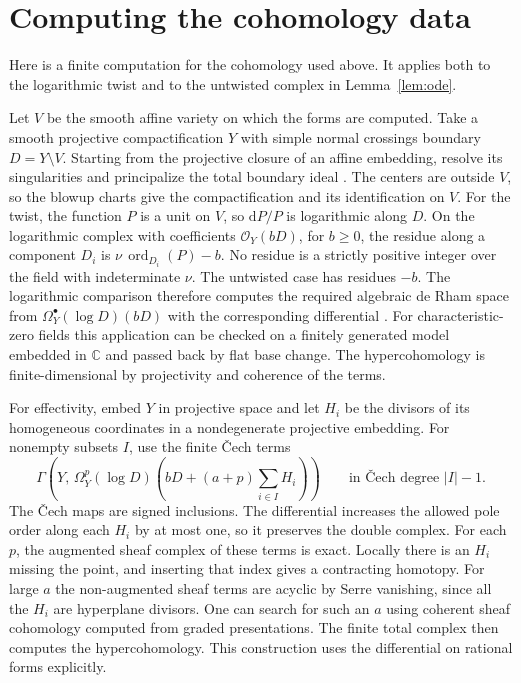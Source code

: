 \documentclass[11pt]{article}
\newcommand{\A}{\mathcal O}
\newcommand{\dd}{\mathrm d}
\begin{document}
\section{Computing the cohomology data}\label{sec:effective}

Here is a finite computation for the cohomology used above.
It applies both to the logarithmic twist and to the untwisted
complex in Lemma~\ref{lem:ode}.

Let \(V\) be the smooth affine variety on which the forms are
computed. Take a smooth projective compactification \(Y\) with
simple normal crossings boundary \(D=Y\setminus V\).
Starting from the projective closure of an affine embedding,
resolve its singularities and principalize the total boundary
ideal \cite[Theorems 1.6 and 1.10]{BM}. The centers are outside
\(V\), so the blowup charts give the compactification and its
identification on \(V\). For the twist, the
function \(P\) is a unit on \(V\), so \(\dd P/P\) is logarithmic
along \(D\). On the logarithmic complex with coefficients
\(\A_Y(bD)\), for \(b\ge0\), the residue along a component \(D_i\)
is \(\nu\,\operatorname{ord}_{D_i}(P)-b\). No residue is a
strictly positive integer over the field with indeterminate
\(\nu\). The untwisted case has residues \(-b\).
The logarithmic comparison therefore computes the required
algebraic de Rham space from
\(\Omega_Y^\bullet(\log D)(bD)\) with the corresponding differential
\cite[II, Corollaires 3.14--3.15]{Deligne}. For characteristic-zero
fields this application can be checked on a finitely generated
model embedded in \(\mathbb C\) and passed back by flat base change.
The hypercohomology is finite-dimensional by projectivity and
coherence of the terms.

For effectivity, embed \(Y\) in projective space and let \(H_i\)
be the divisors of its homogeneous coordinates in a
nondegenerate projective embedding. For nonempty
subsets \(I\), use the finite Čech terms
\[
 \Gamma\!\left(Y,\,
   \Omega_Y^p(\log D)\left(bD+(a+p)\sum_{i\in I}H_i\right)\right)
       \qquad\text{in Čech degree } |I|-1.
\]
The Čech maps are signed inclusions. The differential increases
the allowed pole order along each \(H_i\) by at most one, so it
preserves the double complex. For each \(p\), the augmented sheaf
complex of these terms is exact. Locally there is an \(H_i\)
missing the point, and inserting that index gives a contracting
homotopy. For large \(a\) the non-augmented sheaf terms are acyclic
by Serre vanishing, since all the \(H_i\) are hyperplane divisors.
One can search for such an \(a\) using coherent sheaf cohomology
computed from graded presentations. The finite total complex then
computes the hypercohomology. This construction uses the differential
on rational forms explicitly.
\end{document}

